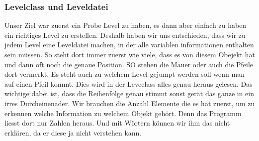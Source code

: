 \documentclass[12pt,a4paper]{scrartcl}
\begin{document}
\subsubsection{Levelclass und Leveldatei}
Unser Ziel war zuerst ein Probe Level zu haben, es dann aber einfach zu haben ein richtiges Level zu erstellen. Deshalb haben wir uns entschieden, dass wir zu jedem Level eine Leveldatei machen, in der alle variablen informationen 
enthalten sein müssen. So steht dort immer zuerst wie viele, dass es von diesem Obejekt hat und dann oft noch die genaue 
Position. SO stehen die Mauer oder auch die Pfeile dort vermerkt. Es steht auch zu welchem Level gejumpt werden soll wenn 
man auf einen Pfeil kommt.
Dies wird in der Leveclass alles genau heraus gelesen. Das wichtige dabei ist, dass die Reihenfolge genau stimmt sonst gerät 
das ganze in ein irres Durcheinenader. Wir brauchen die Anzahl Elemente die es hat zuerst, um zu erkennen welche Information 
zu welchem Objekt gehört. Denn das Programm liesst dort nur Zahlen heraus. Und mit Wörtern können wir ihm das nicht erklären, 
da er diese ja nicht verstehen kann.
\end{document}
